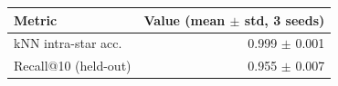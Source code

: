 \begin{tabular}{lr}
  \toprule
  Metric & Value (mean $\pm$ std, 3 seeds) \\
  \midrule
  kNN intra-star acc.        & 0.999 $\pm$ 0.001 \\
  Recall@10 (held-out)       & 0.955 $\pm$ 0.007 \\
  \bottomrule
\end{tabular}
